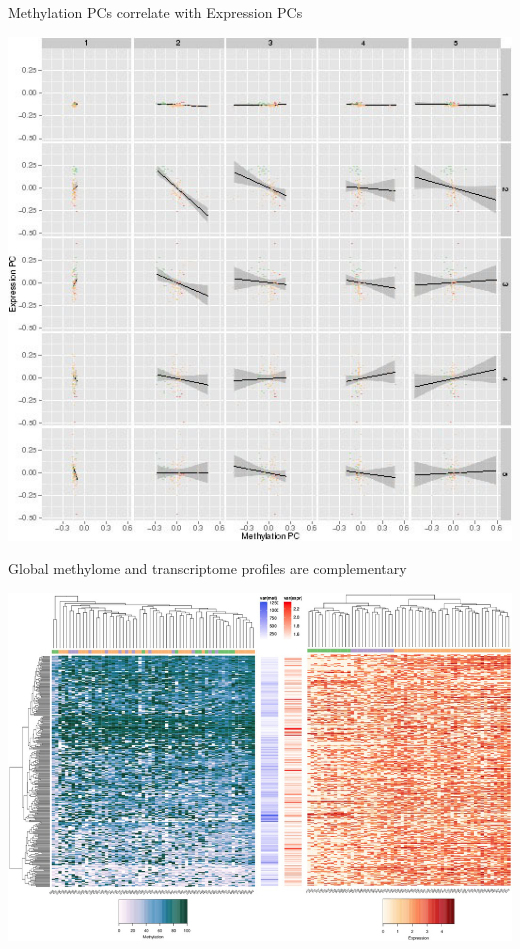\documentclass[10pt, compress]{beamer}
\renewcommand{\(}{\begin{columns}}
\renewcommand{\)}{\end{columns}}
\newcommand{\<}[1]{\begin{column}{#1}}
\renewcommand{\>}{\end{column}}
\begin{document}
\begin{frame}[fragile]
		\centering \large Methylation PCs correlate with Expression PCs
	\vspace*{-12pt}
	\begin{center}
		
		\includegraphics[width=\linewidth,height=\textheight,keepaspectratio]{images/pca2}
	\end{center}
\end{frame}
	
\begin{frame}[fragile]
	\begin{center}\large{Global methylome and transcriptome profiles are complementary}\end{center}
	\vspace*{-10pt}
	\begin{center}
		\includegraphics[width=\linewidth,height=\textheight,keepaspectratio]{images/clustering}
	\end{center}
\end{frame}
\end{document}
